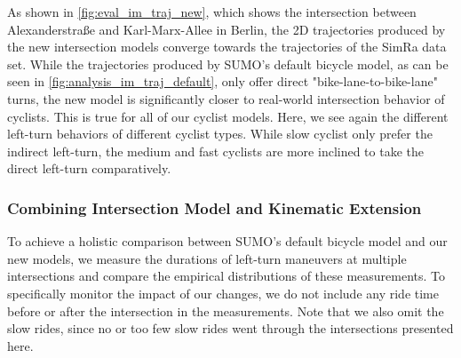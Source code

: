 As shown in \cref{fig:eval_im_traj_new}, which shows the intersection between Alexanderstraße and Karl-Marx-Allee in Berlin, the 2D trajectories produced by the new intersection models converge towards the trajectories of the SimRa data set.
While the trajectories produced by SUMO's default bicycle model, as can be seen in \cref{fig:analysis_im_traj_default}, only offer direct "bike-lane-to-bike-lane" turns, the new model is significantly closer to real-world intersection behavior of cyclists.
This is true for all of our cyclist models.
Here, we see again the different left-turn behaviors of different cyclist types.
While slow cyclist only prefer the indirect left-turn, the medium and fast cyclists are more inclined to take the direct left-turn comparatively.

\subsubsection{Combining Intersection Model and Kinematic Extension}
\label{subsubsec:combinin_intersection_model_and_kinematic_extension}
To achieve a holistic comparison between SUMO's default bicycle model and our new models, we measure the durations of left-turn maneuvers at multiple intersections and compare the empirical distributions of these measurements.
To specifically monitor the impact of our changes, we do not include any ride time before or after the intersection in the measurements.
Note that we also omit the slow rides, since no or too few slow rides went through the intersections presented here.

